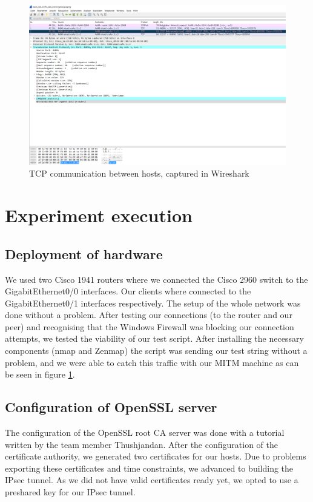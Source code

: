 \documentclass[a4paper]{report}
\begin{document}
\begin{figure}[htb]
	\includegraphics[width=\linewidth]{Testscript_unencrypted.png}
	\caption{TCP communication between hosts, captured in Wireshark}
	\label{fig:TestUnencrypted}
\end{figure}


\section{Experiment execution}
\label{sec:ExpExec}

\subsection{Deployment of hardware}
We used two Cisco 1941 routers where we connected the Cisco 2960 switch to the GigabitEthernet0/0 interfaces. Our clients where connected to the GigabitEthernet0/1 interfaces respectively. The setup of the whole network was done without a problem. After testing our connections (to the router and our peer) and recognising that the Windows Firewall was blocking our connection attempts, we tested the viability of our test script. After installing the necessary components (nmap and Zenmap) the script was sending our test string without a problem, and we were able to catch this traffic with our MITM machine as can be seen in figure \ref{fig:TestUnencrypted}. 

\subsection{Configuration of OpenSSL server}

The configuration of the OpenSSL root CA server was done with a tutorial written by the team member Thushjandan.
After the configuration of the certificate authority, we generated two certificates for our hosts. Due to problems exporting these certificates and time constraints, we advanced to building the IPsec tunnel. As we did not have valid certificates ready yet, we opted to use a preshared key for our IPsec tunnel.
\end{document}
